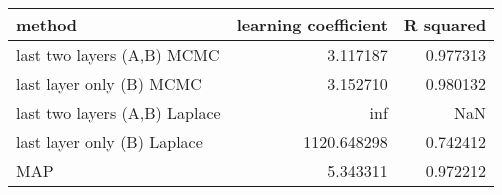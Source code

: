 \begin{tabular}{lrr}
\toprule
                        method &  learning coefficient &  R squared \\
\midrule
    last two layers (A,B) MCMC &              3.117187 &   0.977313 \\
      last layer only (B) MCMC &              3.152710 &   0.980132 \\
 last two layers (A,B) Laplace &                   inf &        NaN \\
   last layer only (B) Laplace &           1120.648298 &   0.742412 \\
                           MAP &              5.343311 &   0.972212 \\
\bottomrule
\end{tabular}
